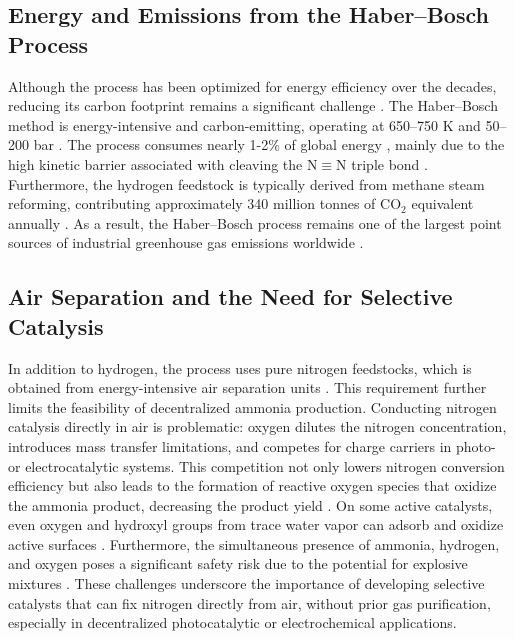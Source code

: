 \subsection{Energy and Emissions from the Haber–Bosch Process}
Although the process has been optimized for energy efficiency over the decades, reducing its carbon footprint remains a significant challenge \cite{Smith2020CurrentLandscape}. The Haber–Bosch method is energy-intensive and carbon-emitting, operating at 650–750 K and 50–200 bar \cite{Comer2019ProspectsFertilizers, Haber1905UberElementen, Tamaru1991CatalyticSynthesis, King1990TheCatalysis, Nielsen1981AmmoniaResearch, Ertl1997HandbookCatalysis, Schloegl2003CatalyticStory, Iriawan_2021, Fernandez2020EditorsParity, Fernandez2020OpportunitiesElectrosynthesis}. The process consumes nearly 1-2\% of global energy \cite{Capdevila-Cortada2019ElectrifyingHaberBosch, Soloveichik2019ElectrochemicalProcess, Kyriakou2020AnProcess}, mainly due to the high kinetic barrier associated with cleaving the $\mathrm{N \equiv N}$ triple bond \cite{vanderHam2014ChallengesTransfer}. Furthermore, the hydrogen feedstock is typically derived from methane steam reforming, contributing approximately 340 million tonnes of CO$_2$ equivalent annually \cite{Abbas2010HydrogenReview}. As a result, the Haber–Bosch process remains one of the largest point sources of industrial greenhouse gas emissions worldwide \cite{Nrskov2016SustainableProduction, Schiffer2017ElectrificationIndustry}.

\subsection{Air Separation and the Need for Selective Catalysis}
In addition to hydrogen, the process uses pure nitrogen feedstocks, which is obtained from energy-intensive air separation units \cite{liu2021prospects}. This requirement further limits the feasibility of decentralized ammonia production. Conducting nitrogen catalysis directly in air is problematic: oxygen dilutes the nitrogen concentration, introduces mass transfer limitations, and competes for  charge carriers in photo- or electrocatalytic systems. This competition not only lowers nitrogen conversion efficiency but also leads to the formation of reactive oxygen species that oxidize the ammonia product, decreasing the product yield \cite{Ye2017Ni2PLight, Huang2020TowardLigands, comer2018role, Smith2020CurrentLandscape}. On some active catalysts, even oxygen and hydroxyl groups from trace water vapor can adsorb and oxidize active surfaces \cite{Rohr2019ACatalysts}. Furthermore, the simultaneous presence of ammonia, hydrogen, and oxygen poses a significant safety risk due to the potential for explosive mixtures \cite{Silverman1938LeAmmonia}. These challenges underscore the importance of developing selective catalysts that can fix nitrogen directly from air, without prior gas purification, especially in decentralized photocatalytic or electrochemical applications.


